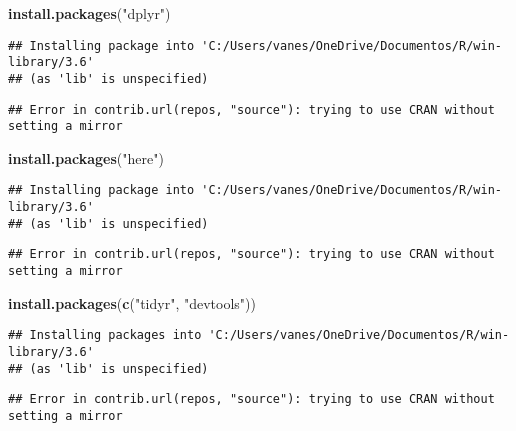 \documentclass[
]{article}
\newenvironment{Shaded}{\begin{snugshade}}{\end{snugshade}}
\newcommand{\KeywordTok}[1]{\textcolor[rgb]{0.13,0.29,0.53}{\textbf{#1}}}
\newcommand{\NormalTok}[1]{#1}
\newcommand{\StringTok}[1]{\textcolor[rgb]{0.31,0.60,0.02}{#1}}
\begin{document}
\begin{Shaded}
\begin{Highlighting}[]
\KeywordTok{install.packages}\NormalTok{(}\StringTok{"dplyr"}\NormalTok{)}
\end{Highlighting}
\end{Shaded}

\begin{verbatim}
## Installing package into 'C:/Users/vanes/OneDrive/Documentos/R/win-library/3.6'
## (as 'lib' is unspecified)
\end{verbatim}

\begin{verbatim}
## Error in contrib.url(repos, "source"): trying to use CRAN without setting a mirror
\end{verbatim}

\begin{Shaded}
\begin{Highlighting}[]
\KeywordTok{install.packages}\NormalTok{(}\StringTok{"here"}\NormalTok{)}
\end{Highlighting}
\end{Shaded}

\begin{verbatim}
## Installing package into 'C:/Users/vanes/OneDrive/Documentos/R/win-library/3.6'
## (as 'lib' is unspecified)
\end{verbatim}

\begin{verbatim}
## Error in contrib.url(repos, "source"): trying to use CRAN without setting a mirror
\end{verbatim}

\begin{Shaded}
\begin{Highlighting}[]
\KeywordTok{install.packages}\NormalTok{(}\KeywordTok{c}\NormalTok{(}\StringTok{"tidyr"}\NormalTok{, }\StringTok{"devtools"}\NormalTok{))}
\end{Highlighting}
\end{Shaded}

\begin{verbatim}
## Installing packages into 'C:/Users/vanes/OneDrive/Documentos/R/win-library/3.6'
## (as 'lib' is unspecified)
\end{verbatim}

\begin{verbatim}
## Error in contrib.url(repos, "source"): trying to use CRAN without setting a mirror
\end{verbatim}
\end{document}
